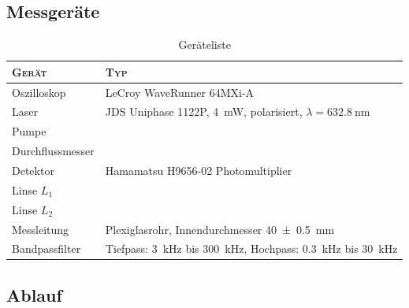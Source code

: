 \clearpage
\subsection{Messger\"ate}
\label{subsec:messgerate}

\begin{table}[h!t]
    \centering
    \caption{Ger\"ateliste}
    \begin{tabular}{ll}
        \toprule
        \textsc{Ger\"at}
        & \textsc{Typ}
        \\

        \midrule

        Oszilloskop
        & LeCroy WaveRunner 64MXi-A
        \\

        Laser
        & JDS Uniphase 1122P, \SI{4}{\milli\watt}, polarisiert, $\lambda = \SI{632,8}{\nano\meter}$
        \\

        Pumpe
        & %
        \\

        Durchflussmesser
        & %
        \\

        Detektor
        & Hamamatsu H9656-02 Photomultiplier
        \\

        Linse $L_1$
        & %
        \\

        Linse $L_2$
        & \\

        Messleitung
        & Plexiglasrohr, Innendurchmesser \SI{40 \pm 0.5}{\milli\meter}
        \\

        Bandpassfilter
        & Tiefpass: \SI{3}{\kilo\hertz} bis \SI{300}{\kilo\hertz}, Hochpass: \SI{0.3}{\kilo\hertz} bis \SI{30}{\kilo\hertz}
        \\

        \bottomrule
    \end{tabular}
\end{table}


\clearpage
\subsection{Ablauf}
\label{subsec:ablauf}

